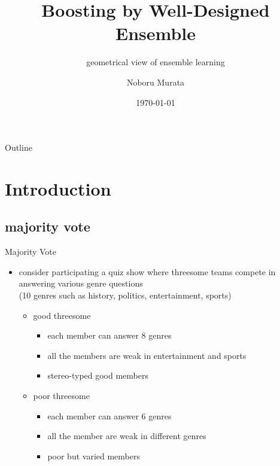 \documentclass[fleqn,aspectratio=1610]{beamer}
\author{Noboru Murata}
\date{\today}
\title{Boosting by Well-Designed Ensemble}
\subtitle{geometrical view of ensemble learning}
\institute{\url{https://noboru-murata.github.io/}}
\begin{document}
\maketitle
\begin{frame}{Outline}
\tableofcontents
\end{frame}

\section{Introduction}
\label{sec:org741b0f3}
\subsection{majority vote}
\label{sec:orgbed6476}
\begin{frame}[label={sec:org9147118}]{Majority Vote}
\begin{itemize}
\item <1-> consider participating a quiz show where 
threesome teams compete in answering various genre questions \\
(10 genres such as history, politics, entertainment, sports)
\vspace{10pt}
\begin{itemize}
\item <2-> good threesome
\begin{itemize}
\item <3-> each member can answer 8 genres
\item <3-> all the members are weak in entertainment and sports
\item <3-> \alert{stereo-typed good members}
\end{itemize}
\end{itemize}
\vspace{10pt}
\begin{itemize}
\item <2-> poor threesome 
\begin{itemize}
\item <3-> each member can answer 6 genres
\item <3-> all the member are weak in different genres
\item <3-> \alert{poor but varied members}
\end{itemize}
\end{itemize}
\end{itemize}
\end{frame}
\end{document}
